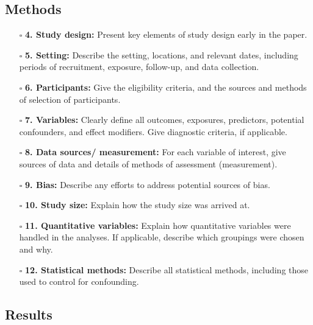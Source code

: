 \documentclass[11pt]{article}
\def\tightlist{}
\begin{document}
\begin{Form}
\subsection{Methods}\label{methods}

\begin{itemize}
\tightlist
\item[$\square$]
  \textbf{4. Study design:} Present key elements of study design early
  in the paper.
\item[$\square$]
  \textbf{5. Setting:} Describe the setting, locations, and relevant
  dates, including periods of recruitment, exposure, follow-up, and data
  collection.
\item[$\square$]
  \textbf{6. Participants:} Give the eligibility criteria, and the
  sources and methods of selection of participants.
\item[$\square$]
  \textbf{7. Variables:} Clearly define all outcomes, exposures,
  predictors, potential confounders, and effect modifiers. Give
  diagnostic criteria, if applicable.
\item[$\square$]
  \textbf{8. Data sources/ measurement:} For each variable of interest,
  give sources of data and details of methods of assessment
  (measurement).
\item[$\square$]
  \textbf{9. Bias:} Describe any efforts to address potential sources of
  bias.
\item[$\square$]
  \textbf{10. Study size:} Explain how the study size was arrived at.
\item[$\square$]
  \textbf{11. Quantitative variables:} Explain how quantitative
  variables were handled in the analyses. If applicable, describe which
  groupings were chosen and why.
\item[$\square$]
  \textbf{12. Statistical methods:} Describe all statistical methods,
  including those used to control for confounding.
\end{itemize}

\subsection{Results}\label{results}


\end{Form}
\end{document}

